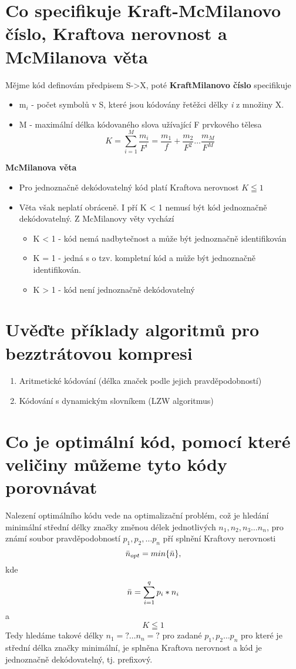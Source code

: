 \section{Co specifikuje Kraft-McMilanovo číslo, Kraftova nerovnost a McMilanova věta}
Mějme kód definovám předpisem S->X, poté \textbf{KraftMilanovo číslo} specifikuje
\begin{itemize}
    \item m$_i$ - počet symbolů v S, které jsou kódovány řetěžci dělky \emph{i} z množiny X.
    \item M - maximální délka kódovaného slova užívající F prvkového tělesa
    $$K = \sum_{i=1}^M \frac{m_i}{F^i}= \frac{m_1}{f} + \frac{m_2}{F^2} \dots \frac{m_M}{F^M}$$
\end{itemize}
\textbf{McMilanova věta}
\begin{itemize}
    \item Pro jednoznačně dekódovatelný kód platí Kraftova nerovnost $K \leqq 1$
    \item Věta však neplatí obráceně.
    I pří K < 1 nemusí být kód jednoznačně dekódovatelný.
    Z McMilanovy věty vychází
    \begin{itemize}
        \item K < 1 - kód nemá nadbytečnost a může být jednoznačně identifikován
        \item K = 1 - jedná s o tzv. kompletní kód a může být jednoznačně identifikován.
        \item K > 1 - kód není jednoznačně dekódovatelný
    \end{itemize}
\end{itemize}
\section{Uvěďte příklady algoritmů pro bezztrátovou kompresi}
\begin{enumerate}
    \item Aritmetické kódování (délka značek podle jejich pravděpodobností)
    \item Kódování s dynamickým slovníkem (LZW algoritmus)
\end{enumerate}

\section{Co je optimální kód, pomocí které veličiny můžeme tyto kódy porovnávat}
Nalezení optimálního kódu vede  na optimalizační problém, což je hledání minimální střední délky značky změnou délek jednotlivých $n_1, n_2, n_3 \dots n_n$, pro známí soubor pravděpodobností $p_1, p_2, \dots p_n$ pří splnění Kraftovy nerovnosti
$$\Bar{n}_{opt} = min \{\Bar{n}\},$$ kde
$$\Bar{n}=\sum_{i=1}^q p_i*n_i$$ a 
$$K\leqq1$$
Tedy hledáme takové délky $n_1=? \dots n_n=?$ pro zadané $p_1,p_2\dots p_n$ pro které je střední délka značky minimální, je splněna Kraftova nerovnost a kód je jednoznačně dekódovatelný, tj. prefixový.

